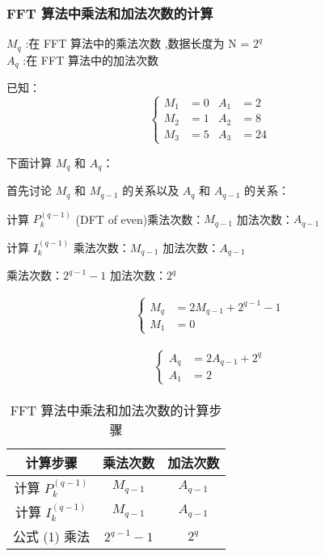 \documentclass[12pt,a4paper]{article}
\numberwithin{subsection}{section}   %
\numberwithin{subsubsection}{subsection}
\theoremstyle{plain}
\theoremstyle{definition}
\theoremstyle{remark}
\theoremstyle{remark}
\begin{document}
	\subsubsection{FFT 算法中乘法和加法次数的计算}
			$M_q$ :在 FFT 算法中的乘法次数 ,数据长度为 N = $2^q$  \\
			$A_q$ :在 FFT 算法中的加法次数
		

	已知：
	\begin{equation}
			\left\{
		\begin{aligned}
			M_1 &= 0 & A_1 &= 2 \\
			M_2 &= 1 & A_2 &= 8 \\
			M_3 &= 5 & A_3 &= 24
		\end{aligned}
			\right.
	\end{equation}
	
	下面计算 \(M_q\) 和 \(A_q\)：
	
	首先讨论 \(M_q\) 和 \(M_{q-1}\) 的关系以及 \(A_q\) 和 \(A_{q-1}\) 的关系：
	

计算 \(P_k^{(q-1)}\) (DFT of even)\quad 乘法次数：\(M_{q-1}\) \quad 加法次数：\(A_{q-1}\)

计算 \(I_k^{(q-1)}\) \quad 乘法次数：\(M_{q-1}\) \quad 加法次数：\(A_{q-1}\)

 乘法次数：\(2^{q-1} - 1\) \quad 加法次数：\(2^q\)

	
	\begin{equation}
		\begin{aligned}
			\left\{
			\begin{aligned}
				M_q &= 2 M_{q-1} + 2^{q-1} - 1 \\
				M_1 &= 0
			\end{aligned}
			\right.
		\end{aligned}
	\end{equation}
	
	\begin{equation}
		\begin{aligned}
			\left\{
			\begin{aligned}
				A_q &= 2 A_{q-1} + 2^q \\
				A_1 &= 2
			\end{aligned}
			\right.
		\end{aligned}
	\end{equation}
	
\begin{table}[h]
	\centering
	\caption{FFT 算法中乘法和加法次数的计算步骤}
	\begin{tabular}{|c|c|c|}
		\hline
		计算步骤 & 乘法次数 & 加法次数 \\
		\hline
		计算 \(P_k^{(q-1)}\) & \(M_{q-1}\) & \(A_{q-1}\) \\
		\hline
		计算 \(I_k^{(q-1)}\) & \(M_{q-1}\) & \(A_{q-1}\) \\
		\hline
		公式 (1) 乘法 & \(2^{q-1} - 1\) & \(2^q\) \\
		\hline
	\end{tabular}
\end{table}
	
\end{document}
